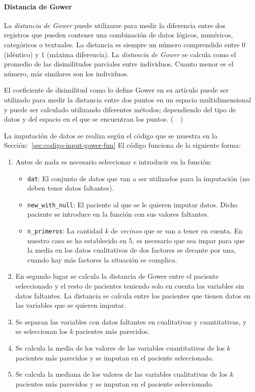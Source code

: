 \paragraph*{Distancia de Gower}

La \textit{distancia de Gower} puede utilizarse para medir la diferencia entre dos registros que pueden contener una combinación de datos lógicos, numéricos, categóricos o textuales. La distancia es siempre un número comprendido entre 0 (idéntico) y 1 (máxima diferencia). La \textit{distancia de Gower} se calcula como el promedio de las disimilitudes parciales entre individuos. Cuanto menor es el número, más similares son los individuos.

El coeficiente de disimilitud como lo define Gower en su artículo puede ser utilizado para medir la distancia entre dos puntos en un espacio multidimensional y puede ser calculado utilizando diferentes métodos; dependiendo del tipo de datos y del espacio en el que se encuentran los puntos. (~\cite{Gower1971}~)

La imputación de datos se realiza según el código que se muestra en la Sección:~\ref{sec:codigo-input-gower-fun} El código funciona de la siguiente forma: 
\begin{enumerate}
    \item Antes de nada es necesario seleccionar e introducir en la función: 
    \begin{itemize}
        \item \texttt{dat}: El conjunto de datos que van a ser utilizados para la imputación (no deben tener datos faltantes).
        \item \texttt{new\_with\_null}: El paciente al que se le quieren imputar datos. Dicho paciente se introduce en la función con sus valores faltantes.
        \item \texttt{n\_primeros}: La cantidad $k$ de \textit{vecinos} que se van a tener en cuenta. En nuestro caso se ha establecido en 5, es necesario que sea impar para que la media en los datos cualitativos de dos factores se decante por una, cuando hay más factores la situación se complica. 
    \end{itemize}
    \item En segundo lugar se calcula la distancia de Gower entre el paciente seleccionado y el resto de pacientes teniendo solo en cuenta las variables sin datos faltantes. La distancia se calcula entre los pacientes que tienen datos en las variables que se quieren imputar. 
    \item Se separan las variables con datos faltantes en cualitativas y cuantitativas, y se seleccionan los $k$ pacientes más parecidos.
    \item Se calcula la media de los valores de las variables cuantitativas de los $k$ pacientes más parecidos y se imputan en el paciente seleccionado.
    \item Se calcula la mediana de los valores de las variables cualitativas de los $k$ pacientes más parecidos y se imputan en el paciente seleccionado.
\end{enumerate}

